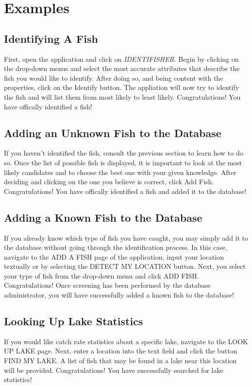 \documentclass{article}
\begin{document}
\section{Examples}

\subsection{Identifying A Fish}
First, open the application and click on \textit{IDENTIFISHER}. Begin by clicking on the drop-down menus and select the most accurate attributes that describe the fish you would like to identify. After doing so, and being content with the properties, click on the Identify button. The appliation will now try to identify the fish and will list them from most likely to least likely. Congratulations! You have offically identified a fish!

\subsection{Adding an Unknown Fish to the Database}
If you haven't identified the fish, consult the previous section to learn how to do so. Once the list of possible fish is displayed, it is important to look at the most likely candidates and to choose the best one with your given knowledge. After deciding and clicking on the one you believe is correct, click Add Fish. Congratulations! You have offically identified a fish and added it to the database!

\subsection{Adding a Known Fish to the Database}
If you already know which type of fish you have caught, you may simply add it to the database without going through the identification process. In this case, navigate to the ADD A FISH page of the application, input your location textually or by selecting the DETECT MY LOCATION button. Next, you select your type of fish from the drop-down menu and click ADD FISH. Congratulations! Once screening has been performed by the database administrator, you will have successfully added a known fish to the database! 

\subsection{Looking Up Lake Statistics}
If you would like catch rate statistics about a specific lake, navigate to the LOOK UP LAKE page. Next, enter a location into the text field and click the button FIND MY LAKE. A list of fish that may be found in a lake near this location will be provided. Congratulations! You have successfully searched for lake statistics!
\end{document}
